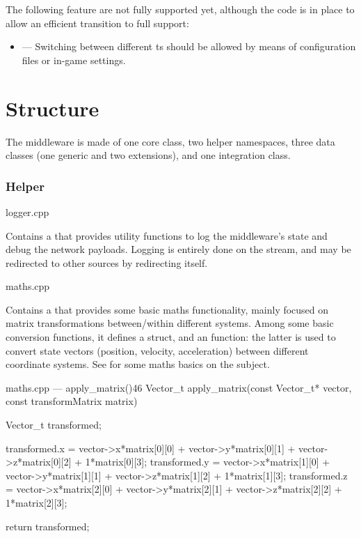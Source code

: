 \FLOATnoindent The following \gls{feature} are not fully supported yet, although the code is in place to allow an efficient transition to full support:

\begin{itemize}
	\item {} --- Switching between different \gls{ts} should be allowed by means of configuration files or in-game settings.
\end{itemize}

\section{Structure}\label{sc:middleware:structure}

The \gls{middleware} is made of one core class, two helper namespaces, three data classes (one generic and two extensions), and one integration class.

\subsubsection{Helper}

\begin{filelist}
	\item logger.cpp
\end{filelist}

Contains a  that provides utility functions to log the \gls{middleware}'s state and debug the network \glspl{payload}. Logging is entirely done on the  stream, and may be redirected to other sources by redirecting  itself.

\begin{filelist}
	\item maths.cpp
\end{filelist}

Contains a  that provides some basic maths functionality, mainly focused on matrix transformations between/within different  systems. Among some basic conversion functions, it defines a  struct, and an  function: the latter is used to convert state vectors (position, velocity, acceleration) between different coordinate systems. See  for some maths basics on the subject.

\begin{codelist}{maths.cpp --- apply\_matrix()}{46}
Vector_t apply_matrix(const Vector_t* vector, const transformMatrix matrix) {
	Vector_t transformed;

	transformed.x = vector->x*matrix[0][0] + vector->y*matrix[0][1] + vector->z*matrix[0][2] + 1*matrix[0][3];
	transformed.y = vector->x*matrix[1][0] + vector->y*matrix[1][1] + vector->z*matrix[1][2] + 1*matrix[1][3];
	transformed.z = vector->x*matrix[2][0] + vector->y*matrix[2][1] + vector->z*matrix[2][2] + 1*matrix[2][3];

	return transformed;
}
\end{codelist}

